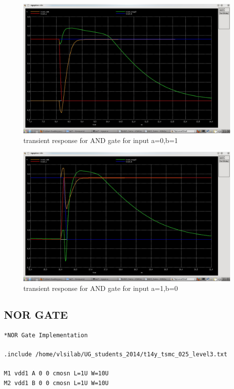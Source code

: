 \documentclass[12pt,a4paper]{article}
\begin{document}
\begin{center}
\begin{figure}[h]
\centering
\includegraphics[scale=.4]{AND_Gate_01.jpeg}
\caption[Short]{transient response for AND gate for input a=0,b=1 }
\end{figure}
\clearpage

\begin{figure}[h]
\centering
\includegraphics[scale=.45]{AND_Gate_10.jpeg}
\caption[Short]{transient response for AND gate for input a=1,b=0 }
\end{figure}

\subsection{NOR GATE}
\begin{lstlisting}
*NOR Gate Implementation

.include /home/vlsilab/UG_students_2014/t14y_tsmc_025_level3.txt

M1 vdd1 A 0 0 cmosn L=1U W=10U
M2 vdd1 B 0 0 cmosn L=1U W=10U


\end{lstlisting}
\end{center}
\end{document}
